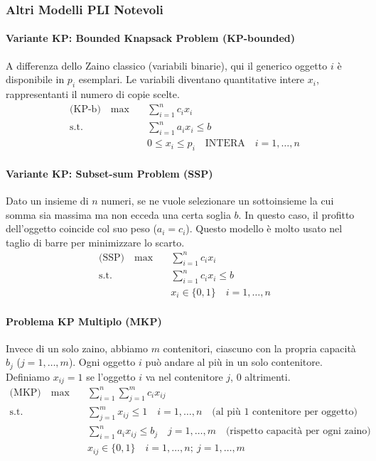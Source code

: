 \documentclass[12pt]{extarticle} %
\begin{document}
\subsubsection{Altri Modelli PLI Notevoli}

\paragraph{Variante KP: Bounded Knapsack Problem (KP-bounded)}
A differenza dello Zaino classico (variabili binarie), qui il generico oggetto $i$ è disponibile in $p_i$ esemplari.
Le variabili diventano quantitative intere $x_i$, rappresentanti il numero di copie scelte.
\[
\begin{aligned}
\text{(KP-b)} \quad \max \quad & \sum_{i=1}^n c_i x_i \\
\text{s.t.} \quad & \sum_{i=1}^n a_i x_i \le b \\
& 0 \le x_i \le p_i \quad \text{INTERA} \quad i=1,\dots,n
\end{aligned}
\]

\paragraph{Variante KP: Subset-sum Problem (SSP)}
Dato un insieme di $n$ numeri, se ne vuole selezionare un sottoinsieme la cui somma sia massima ma non ecceda una certa soglia $b$. In questo caso, il profitto dell'oggetto coincide col suo peso ($a_i = c_i$). Questo modello è molto usato nel taglio di barre per minimizzare lo scarto.
\[
\begin{aligned}
\text{(SSP)} \quad \max \quad & \sum_{i=1}^n c_i x_i \\
\text{s.t.} \quad & \sum_{i=1}^n c_i x_i \le b \\
& x_i \in \{0,1\} \quad i=1,\dots,n
\end{aligned}
\]

\paragraph{Problema KP Multiplo (MKP)}
Invece di un solo zaino, abbiamo $m$ contenitori, ciascuno con la propria capacità $b_j$ ($j=1,\dots,m$). Ogni oggetto $i$ può andare al più in un solo contenitore.
Definiamo $x_{ij} = 1$ se l'oggetto $i$ va nel contenitore $j$, $0$ altrimenti.
\[
\begin{aligned}
\text{(MKP)} \quad \max \quad & \sum_{i=1}^n \sum_{j=1}^m c_i x_{ij} \\
\text{s.t.} \quad & \sum_{j=1}^m x_{ij} \le 1 \quad i=1,\dots,n \quad \text{(al più 1 contenitore per oggetto)} \\
& \sum_{i=1}^n a_i x_{ij} \le b_j \quad j=1,\dots,m \quad \text{(rispetto capacità per ogni zaino)} \\
& x_{ij} \in \{0,1\} \quad i=1,\dots,n; \: j=1,\dots,m
\end{aligned}
\]
\end{document}
